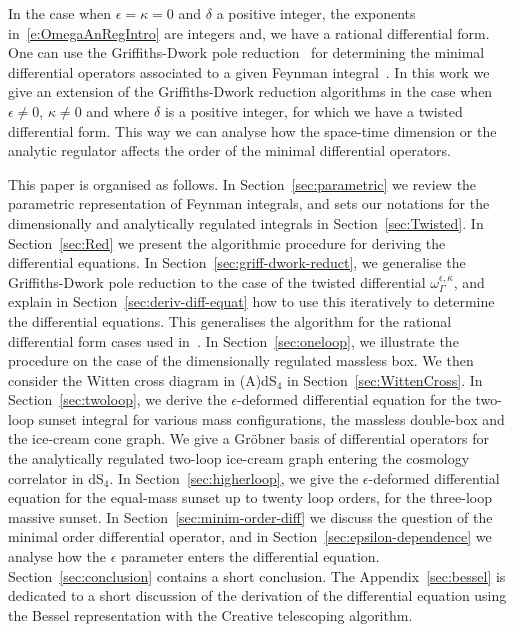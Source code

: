 \documentclass[a4paper,12pt]{article}
\numberwithin{equation}{section}
\numberwithin{figure}{section}
\begin{document}
In the case when $\epsilon=\kappa=0$ and $\delta$ a positive integer, the exponents
in~\eqref{e:OmegaAnRegIntro} are
integers and,
we have a rational differential form. One can use the  Griffiths-Dwork
pole reduction~\cite{Griffiths_1969,Griffith1,Griffith2,Dwork_1962,Dwork_1964} for determining the minimal differential operators associated to a given Feynman
integral~\cite{Bloch:2016izu,Vanhove:2018mto,Lairez:2022zkj}.
In this work we give an extension of the Griffiths-Dwork reduction  algorithms in the case when
$\epsilon\neq0$, $\kappa\neq0$ and where $\delta$ is a positive
integer, for which   we have a twisted differential
form.
%
 This way we
can analyse how the space-time dimension or the analytic regulator  affects the order of the
minimal differential operators.



This paper is organised as follows. 
In Section~\ref{sec:parametric} we review the parametric
representation of Feynman integrals, and sets our notations for the 
dimensionally and analytically regulated integrals in Section~\ref{sec:Twisted}.
In Section~\ref{sec:Red} we
present the algorithmic procedure for deriving the differential
equations. In Section~\ref{sec:griff-dwork-reduct},  we generalise the
Griffiths-Dwork pole reduction to the case of the twisted differential
$\omega_\Gamma^{\epsilon,\kappa}$, and explain in
Section~\ref{sec:deriv-diff-equat} how to use this iteratively to
determine the differential equations. This generalises the algorithm  for the rational differential form cases
used in~\cite{Lairez:2022zkj}. In Section~\ref{sec:oneloop}, we
illustrate the procedure on the case of the dimensionally regulated massless box.
We then consider the Witten cross diagram in (A)dS$_4$ in Section~\ref{sec:WittenCross}.
In
Section~\ref{sec:twoloop}, we derive the $\epsilon$-deformed
differential equation for the two-loop sunset integral for various
mass configurations, the massless double-box and the ice-cream cone
graph. We give a Gr\"obner basis of differential operators for the
analytically regulated
two-loop ice-cream graph entering the cosmology correlator in dS$_4$. In Section~\ref{sec:higherloop}, we give the $\epsilon$-deformed
differential
equation for the equal-mass sunset up to twenty loop orders, for
the three-loop massive sunset.
In Section~\ref{sec:minim-order-diff}
we discuss the question of the minimal order differential operator,
and in Section~\ref{sec:epsilon-dependence} we analyse how the
$\epsilon$ parameter enters the differential
equation. Section~\ref{sec:conclusion} contains a short
conclusion. The Appendix~\ref{sec:bessel} is dedicated to a short
discussion of the derivation of the differential equation using the
Bessel representation with the Creative telescoping algorithm.
\end{document}
